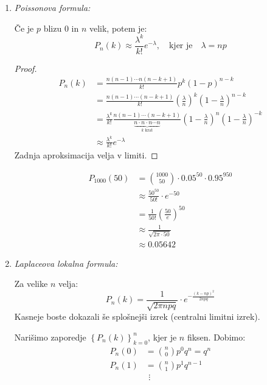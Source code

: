 \documentclass[12pt]{book}
\theoremstyle{definition}
\theoremstyle{plain}
\theoremstyle{plain}
\theoremstyle{plain}
\theoremstyle{remark}
\begin{document}
\begin{enumerate}[label=(\alph*)]
    \item \emph{Poissonova formula:}
    
    Če je $p$ blizu $0$ in $n$ velik, potem je: 
    $$
    P_n(k) \approx \frac{\lambda^k}{k !} e^{-\lambda}, \quad \text{kjer je} \quad \lambda = n p
    $$
    \begin{proof}
        $$
        \begin{aligned}
            P_n(k)&=\frac{n(n-1) \cdots n(n-k+1)}{k !} p^k (1-p)^{n-k} \\
            &=\frac{n(n-1) \cdots(n-k+1)}{k !}\left(\frac{\lambda}{n}\right)^k \left(1-\frac{\lambda}{n}\right)^{n-k} \\
            &=\frac{\lambda^k}{k !} \frac{n(n-1)\cdots(n-k+1)}{\underbrace{n \cdot n \cdot n \cdots n}_{k \text{ krat}}} \left(1-\frac{\lambda}{n}\right)^n \left(1-\frac{\lambda}{n}\right)^{-k} \\
            &\approx \frac{\lambda^k}{k !} e^{-\lambda}
        \end{aligned}
        $$
        Zadnja aproksimacija velja v limiti. 
    \end{proof}
    \begin{zgled}
        $$
        \begin{aligned}
            P_{1000}(50) &= \binom{1000}{50}\cdot 0.05^{50} \cdot 0.95^{950} \\
            &\approx \frac{50^{50}}{50 !} \cdot e^{-50} \\
            &= \frac{1}{50 !}\left(\frac{50}{e}\right)^{50} \\
            &\approx \frac{1}{\sqrt{2 \pi \cdot 50}} \\
            &\approx 0.05642
        \end{aligned}
        $$
    \end{zgled}
    \item \emph{Laplaceova lokalna formula:}
    
    Za velike $n$ velja: 
    $$
    P_n(k) = \frac{1}{\sqrt{2 \pi n  p q}} \cdot e^{-\frac{\left(k-np\right)^2}{2 n p q}}
    $$
    Kasneje boste dokazali še splošnejši izrek (centralni limitni izrek).

    Narišimo zaporedje $\left\{P_n(k)\right\}_{k=0}^n$, kjer je $n$ fiksen. Dobimo: 
    $$
    \begin{aligned}
        P_n(0)&=\binom{n}{0} p^0 q^n=q^n \\
        P_n(1)&=\binom{n}{1} p^1 q^{n-1} \\
        & \ \, \vdots
    \end{aligned}
    $$
    

\end{enumerate}
\end{document}
